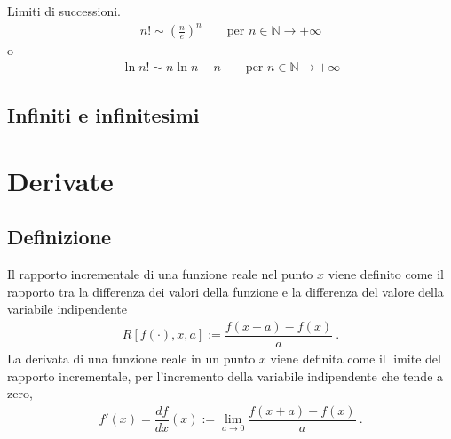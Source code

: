 \documentclass[letterpaper,10pt,english]{jupyterBook}
\begin{document}
\sphinxAtStartPar
Limiti di successioni. 
\begin{equation*}
\begin{split}n! \sim \left(\frac{n}{e} \right)^n \qquad \text{per $n \in \mathbb{N} \rightarrow +\infty$}\end{split}
\end{equation*}
\sphinxAtStartPar
o
\begin{equation*}
\begin{split}\ln n! \sim n \ln n - n  \qquad \text{per $n \in \mathbb{N} \rightarrow +\infty$}\end{split}
\end{equation*}

\subsection{Infiniti e infinitesimi}
\label{\detokenize{ch/infinitesimal_calculus/analysis:infiniti-e-infinitesimi}}
\sphinxstepscope


\section{Derivate}
\label{\detokenize{ch/infinitesimal_calculus/derivatives:derivate}}\label{\detokenize{ch/infinitesimal_calculus/derivatives:infinitesimal-calculus-derivatives}}\label{\detokenize{ch/infinitesimal_calculus/derivatives::doc}}

\subsection{Definizione}
\label{\detokenize{ch/infinitesimal_calculus/derivatives:definizione}}\label{\detokenize{ch/infinitesimal_calculus/derivatives:infinitesimal-calculus-derivatives-def}}
\sphinxAtStartPar
{} Il rapporto incrementale di una funzione reale nel punto \(x\) viene definito come il rapporto tra la differenza dei valori della funzione e la differenza del valore della variabile indipendente
\begin{equation}\label{equation:ch/infinitesimal_calculus/derivatives:eq:infinitesimal-calculus:derivatives:def_delta}
\begin{split}R[f(\cdot), x, a] := \dfrac{f(x+a)-f(x)}{a} \ .\end{split}
\end{equation}
\sphinxAtStartPar
{} La derivata di una funzione reale in un punto \(x\) viene definita come il limite del rapporto incrementale, per l’incremento della variabile indipendente che tende a zero,
\begin{equation}\label{equation:ch/infinitesimal_calculus/derivatives:eq:infinitesimal-calculus:derivatives:def}
\begin{split}f'(x) = \dfrac{d f}{d x}(x) := \lim_{a \rightarrow 0} \dfrac{f(x+a)-f(x)}{a} \ .\end{split}
\end{equation}
\sphinxAtStartPar
{} 
\end{document}

